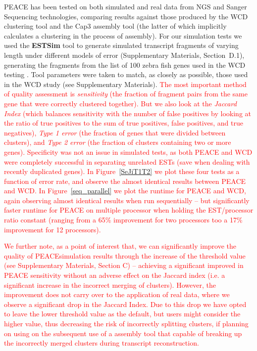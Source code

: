 \documentclass[a4,center,fleqn]{NAR}
\newcommand{\mc}[1]{\textcolor{red}{#1}}
\newcommand{\peace} {{\small PEACE}}
\newcommand{\wcd} {{\small WCD}}
\newcommand{\capthree} {{\small Cap3}}
\begin{document}
\peace\/ has been tested on both simulated and real data from NGS and
Sanger Sequencing technologies, comparing results against those
produced by the \wcd\/ clustering tool \cite{Hazelhurst08a} and the
\capthree\/ assembly tool \cite{Huang99} (the latter of which
implicitly calculates a clustering in the process of assembly).  For
our simulation tests we used the {\bf ESTSim} tool \cite{Hazelhurst03}
to generate simulated transcript fragments of varying length under
different models of error (Supplementary Materials, Section~D.1),
generating the fragments from the list of 100 zebra fish genes used in
the \wcd\/ testing \cite{Hazelhurst08a}.  Tool parameters were taken
to match, as closely as possible, those used in the \wcd\/ study (see
Supplementary Materials).  \mc{The most important method of quality
  assessment is {\it sensitivity} (the fraction of fragment pairs from
  the same gene that were} \mc{correctly clustered together).  But we also
  look at the {\it Jaccard Index} (which balances sensitivity with the
  number of false positives by looking at the ratio of true positives
  to the sum of true positives, false positives, and true negatives),
  {\it Type 1 error} (the fraction of genes that were divided between
  clusters), and {\it Type 2 error} (the fraction of clusters
  containing two or more genes).  Specificity was not an issue in
  simulated tests, as both \peace\/ and \wcd\/ were completely
  successful in separating unrelated ESTs (save when dealing with
  recently duplicated genes).  In Figure~\ref{SeJiT1T2} we plot
  these four tests as a function of error rate, and observe the almost
  identical results between \peace\/ and \wcd\/.  In
  Figure~\ref{seq_parallel} we plot the runtime for \peace\/ and
  \wcd\/, again observing almost identical results when run
  sequentially -- but significantly faster runtime for PEACE on
  multiple processor when holding the EST/processor ratio constant
  (ranging from a 65\% improvement for two processors too a 17\%
  improvement for 12 processors).}

\mc{We further note, as a point of interest that, we can significantly
  improve the quality of \peace simulation results through the
  increase of the threshold value (see Supplementary Materials,
  Section C) -- achieving a significant improved in PEACE sensitivity
  without an adverse effect on the Jaccard index (i.e. a significant
  increase in the incorrect merging of clusters).  However, the
  improvement does not carry over to the application of real data,
  where we observe a significant drop in the Jaccard Index.  Due to
  this drop we have opted to leave the lower threshold value as the
  default, but users might consider the higher value, thus decreasing
  the risk of incorrectly splitting clusters, if planning on
  using on the subsequent use of a assembly tool that capable of
  breaking up the incorrectly merged clusters during transcript reconstruction.}
\end{document}
